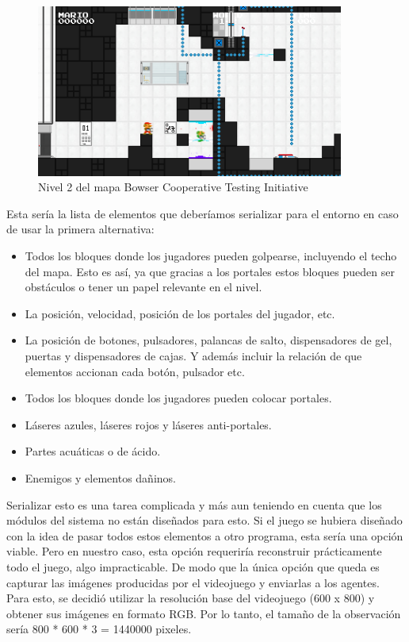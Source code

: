 \begin{figure}[h]
    \centering
    \includegraphics[width=0.9\textwidth]{img/BCTI_observation.png}
    \caption{Nivel 2 del mapa Bowser Cooperative Testing Initiative \cite {mari0-mapa}}
    \label{fig:observartion}
\end{figure}

Esta sería la lista de elementos que deberíamos serializar para el entorno en caso de usar la primera alternativa:

\begin{itemize}
    \item Todos los bloques donde los jugadores pueden golpearse, incluyendo el techo del mapa. Esto es así, ya que gracias a los portales estos bloques pueden ser obstáculos o tener un papel relevante en el nivel.
    \item La posición, velocidad, posición de los portales del jugador, etc.
    \item La posición de botones, pulsadores, palancas de salto, dispensadores de gel, puertas y dispensadores de cajas. Y además incluir la relación de que elementos accionan cada botón, pulsador etc.
    \item Todos los bloques donde los jugadores pueden colocar portales.
    \item Láseres azules, láseres rojos y láseres anti-portales.
    \item Partes acuáticas o de ácido.
    \item Enemigos y elementos dañinos.
\end{itemize}

Serializar esto es una tarea complicada y más aun teniendo en cuenta que los módulos del sistema no están diseñados para esto. Si el juego se hubiera diseñado con la idea de pasar todos estos elementos a otro programa, esta sería una opción viable. Pero en nuestro caso, esta opción requeriría reconstruir prácticamente todo el juego, algo impracticable. De modo que la única opción que queda es capturar las imágenes producidas por el videojuego y enviarlas a los agentes. Para esto, se decidió utilizar la resolución base del videojuego (600 x 800) y obtener sus imágenes en formato RGB. Por lo tanto, el tamaño de la observación sería 800 * 600 * 3 = 1440000 pixeles.